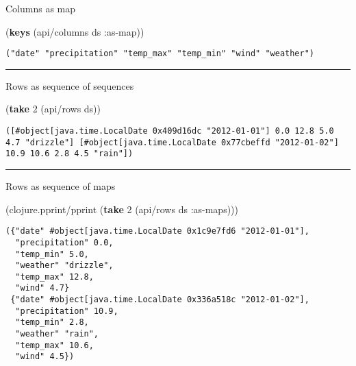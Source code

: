 \documentclass[]{article}
\newenvironment{Shaded}{\begin{snugshade}}{\end{snugshade}}
\newcommand{\KeywordTok}[1]{\textcolor[rgb]{0.13,0.29,0.53}{\textbf{#1}}}
\newcommand{\DecValTok}[1]{\textcolor[rgb]{0.00,0.00,0.81}{#1}}
\newcommand{\AttributeTok}[1]{\textcolor[rgb]{0.77,0.63,0.00}{#1}}
\newcommand{\NormalTok}[1]{#1}
\begin{document}
Columns as map

\begin{Shaded}
\begin{Highlighting}[]
\NormalTok{(}\KeywordTok{keys}\NormalTok{ (api/columns ds }\AttributeTok{:as-map}\NormalTok{))}
\end{Highlighting}
\end{Shaded}

\begin{verbatim}
("date" "precipitation" "temp_max" "temp_min" "wind" "weather")
\end{verbatim}

\begin{center}\rule{0.5\linewidth}{0.5pt}\end{center}

Rows as sequence of sequences

\begin{Shaded}
\begin{Highlighting}[]
\NormalTok{(}\KeywordTok{take} \DecValTok{2}\NormalTok{ (api/rows ds))}
\end{Highlighting}
\end{Shaded}

\begin{verbatim}
([#object[java.time.LocalDate 0x409d16dc "2012-01-01"] 0.0 12.8 5.0 4.7 "drizzle"] [#object[java.time.LocalDate 0x77cbeffd "2012-01-02"] 10.9 10.6 2.8 4.5 "rain"])
\end{verbatim}

\begin{center}\rule{0.5\linewidth}{0.5pt}\end{center}

Rows as sequence of maps

\begin{Shaded}
\begin{Highlighting}[]
\NormalTok{(clojure.pprint/pprint (}\KeywordTok{take} \DecValTok{2}\NormalTok{ (api/rows ds }\AttributeTok{:as-maps}\NormalTok{)))}
\end{Highlighting}
\end{Shaded}

\begin{verbatim}
({"date" #object[java.time.LocalDate 0x1c9e7fd6 "2012-01-01"],
  "precipitation" 0.0,
  "temp_min" 5.0,
  "weather" "drizzle",
  "temp_max" 12.8,
  "wind" 4.7}
 {"date" #object[java.time.LocalDate 0x336a518c "2012-01-02"],
  "precipitation" 10.9,
  "temp_min" 2.8,
  "weather" "rain",
  "temp_max" 10.6,
  "wind" 4.5})
\end{verbatim}
\end{document}
